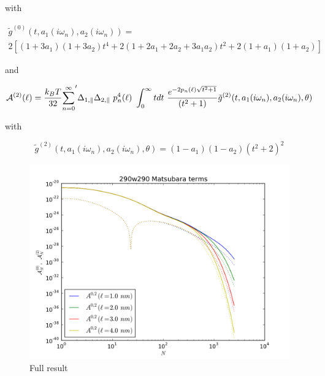 \documentclass[a4paper]{article}
\begin{document}
\begin{center}
with

\begin{multline*}
\tilde g^{(0)}(t, a_1(i \omega_n), a_2(i \omega_n)) = \\ 
2 \left[ (1+3a_1)(1+3a_2) t^{4} + 2 (1+2a_1+2a_2+3a_1a_2) t^{2}  + 2(1+a_1)(1+a_2)\right]
\end{multline*}


and

\begin{equation}
{\cal A}^{(2)}(\ell) = \frac{k_BT}{32}  {\sum_{n=0}^{\infty}}' \Delta_{1,\parallel} \Delta_{2,\parallel} ~p_n^{4}(\ell) ~\int_0^{\infty} t dt ~\frac{e^{- 2 p_n(\ell) \sqrt{t^{2} + 1}}}{(t^{2} + 1)} \tilde g^{(2)}(t, a_1(i \omega_n), a_2(i \omega_n), \theta)
\end{equation}

with

\begin{equation}
\tilde g^{(2)}(t, a_1(i \omega_n), a_2(i \omega_n), \theta) = (1-a_1)(1-a_2)(t^{2} + 2)^2
\label{befgqw}
\end{equation}


\begin{figure}[t!]
\begin{center}
\includegraphics[width=1.2\textwidth]{large_N/290_A_vs_lrg_n.png}
\hskip 43pt
\caption{Full result}
\label{eiz65}
\end{center}
\end{figure} 


\end{center}
\end{document}
